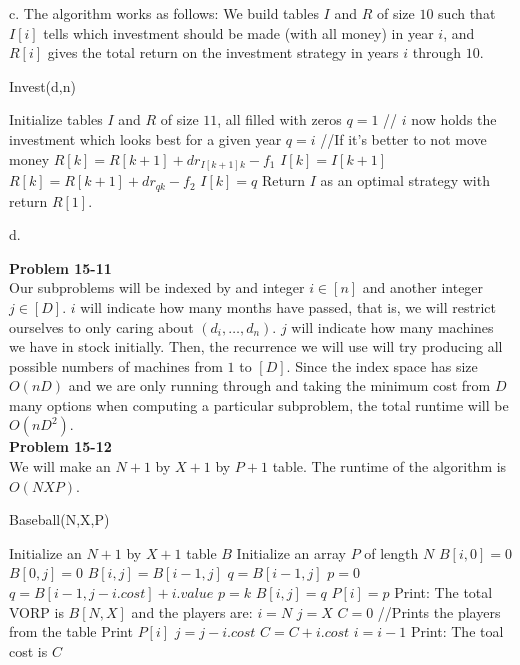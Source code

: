 \documentclass{article}
\begin{document}
c.  The algorithm works as follows: We build tables $I$ and $R$ of size $10$ such that $I[i]$ tells which investment should be made (with all money) in year $i$, and $R[i]$ gives the total return on the investment strategy in years $i$ through $10$.  \\
\begin{algorithm}
\caption{Invest(d,n)}
\begin{algorithmic}
\State Initialize tables $I$ and $R$ of size $11$, all filled with zeros
	\State $q = 1$
		 // $i$ now holds the investment which looks best for a given year
			\State $q = i$
		\EndIf
	\EndFor
	 //If it's better to not move money
		\State $R[k] = R[k+1] + dr_{I[k+1]k} - f_1$
		\State $I[k] = I[k+1]$
	\Else
		\State $R[k] = R[k+1] + dr_{qk} - f_2$
		\State $I[k] = q$
	\EndIf
\EndFor
\State Return $I$ as an optimal strategy with return $R[1]$.
\end{algorithmic}
\end{algorithm}


d. %

\noindent\textbf{Problem 15-11}\\

Our subproblems will be indexed by and integer $i\in[n]$ and another integer $j\in[D]$. $i$ will indicate how many months have passed, that is, we will restrict ourselves to only caring about $(d_i, \ldots,d_n)$. $j$ will indicate how many machines we have in stock initially. Then, the recurrence we will use will try producing all possible numbers of machines from $1$ to $[D]$. Since the index space has size $O(nD)$ and we are only running through and taking the minimum cost from $D$ many options when computing a particular subproblem, the total runtime will be $O(nD^2)$.  \\

\noindent\textbf{Problem 15-12}\\

We will make an $N+1$ by $X+1$ by $P+1$ table. The runtime of the algorithm is $O(NXP)$.

\begin{algorithm}
\caption{Baseball(N,X,P)}
\begin{algorithmic}
\State Initialize an  $N+1$ by $X+1$ table $B$
\State Initialize an array $P$ of length $N$
	\State $B[i,0] = 0$
\EndFor
{}
	\State $B[0,j] = 0$
\EndFor
{}
			\State $B[i,j] = B[i-1,j]$
		\EndIf
		\State $q = B[i-1,j]$
		\State $p = 0$
				\State $q = B[i-1,j-i.cost] + i.value$
				\State $p = k$
			\EndIf
		\EndFor
		\State $B[i,j] = q$
		\State $P[i] = p$
	\EndFor
\EndFor
\State Print: The total VORP is $B[N,X]$ and the players are:
\State $i = N$ 
\State $j = X$
\State $C = 0$
 //Prints the players from the table
		\State Print $P[i]$
		\State $j = j - i.cost$
		\State $C = C + i.cost$
	\EndIf
	\State $i = i - 1$
\EndFor
\State Print: The toal cost is $C$
\end{algorithmic}
\end{algorithm}
\end{document}
